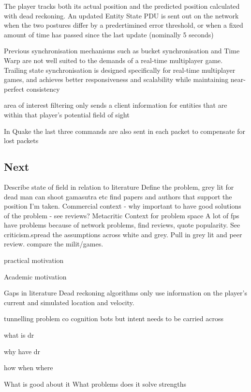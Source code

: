 \documentclass[journal]{IEEEtran}
\begin{document}
The player tracks both its actual position and the predicted position calculated with dead reckoning. An updated Entity State PDU is sent out on the network when the two postures differ by a predertimined error threshold, or when a fixed amount of time has passed since the last update (nominally 5 seconds) \cite{mills1992network}

Previous synchronisation mechanisms such as bucket synchronisation and Time Warp are not well suited to the demands of a real-time multiplayer game. Trailing state synchronisation is designed specifically for real-time multiplayer games, and achieves better responsiveness and scalability while maintaining near-perfect consistency \cite{cronin2001distributed}

area of interest filtering only sends a client information for entities that are within that player’s potential field of sight \cite{cronin2001distributed}

In Quake the last three commands are also sent in each packet to compensate for lost packets \cite{cronin2001distributed}


\subsection{Next}

Describe state of field in relation to literature
Define the problem, grey lit for dead man can shoot gamasutra etc
find papers and authors that support the position I'm taken.
Commercial context - why important to have good solutions of the problem - see reviews? Metacritic
Context for problem space
A lot of fps have problems because of network problems, find reviews, quote popularity. See criticism.spread the assumptions across white and grey. Pull in grey lit and peer review. compare the milit/games.


practical motivation

Academic motivation

Gaps in literature
Dead reckoning algorithms only use information on the player's current and simulated location and velocity.

tunnelling problem
co cognition
bots but intent needs to be carried across



what is dr

why have dr

how when where

What is good about it 
What problems does it solve
strengths
\end{document}
